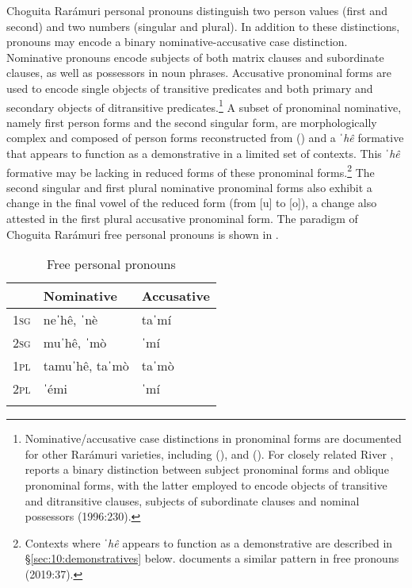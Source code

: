 Choguita Rarámuri personal pronouns distinguish two person values (first and second) and two numbers (singular and plural). In addition to these distinctions, pronouns may encode a binary nominative-accusative case distinction. Nominative pronouns encode subjects of both matrix clauses and subordinate clauses, as well as possessors in noun phrases. Accusative pronominal forms are used to encode single objects of transitive predicates and both primary and secondary objects of ditransitive predicates.\footnote{Nominative/accusative case distinctions in pronominal forms are documented for other Rarámuri varieties, including  (\citealt{brambila1953gramatica}), and  (\citealt{moralesmoreno2016rochecahi}). For closely related River , \citet{miller1996guarijio} reports a binary distinction between subject pronominal forms and oblique pronominal forms, with the latter employed to encode objects of transitive and ditransitive clauses, subjects of subordinate clauses and nominal possessors (1996:230).} A subset of pronominal nominative, namely first person forms and the second singular form, are morphologically complex and composed of person forms reconstructed from  (\citealt{langacker1977uto}) and a \textit{ˈhê} formative that appears to function as a demonstrative in a limited set of contexts. This \textit{ˈhê} formative may be lacking in reduced forms of these pronominal forms.\footnote{Contexts where \textit{ˈhê} appears to function as a demonstrative are described in §\ref{sec:10:demonstratives} below. \citet{villalpando2019grammatical} documents a similar pattern in  free pronouns (2019:37).} The second singular and first plural nominative pronominal forms also exhibit a change in the final vowel of the reduced form (from [u] to [o]), a change also attested in the first plural accusative pronominal form. The paradigm of Choguita Rarámuri free personal pronouns is shown in .

\begin{table}
\begin{tabularx}{.5\textwidth}{lll}
\lsptoprule
& \textbf{Nominative} & \textbf{Accusative}\\
\midrule
 \textsc{1sg} & neˈhê, ˈnè & taˈmí\\
 \textsc{2sg} & muˈhê, ˈmò & ˈmí\\
 \textsc{1pl} & tamuˈhê, taˈmò & taˈmò\\
 \textsc{2pl} & ˈémi & ˈmí\\
\lspbottomrule
\end{tabularx}
\caption{Free personal pronouns}
\label{tab:21:21}
\end{table}

